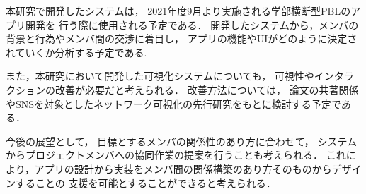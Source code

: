 
本研究で開発したシステムは，
2021年度9月より実施される学部横断型PBLのアプリ開発を
行う際に使用される予定である．
開発したシステムから，メンバの背景と行為やメンバ間の交渉に着目し，
アプリの機能やUIがどのように決定されていくか分析する予定である.

また，本研究において開発した可視化システムについても，
可視性やインタラクションの改善が必要だと考えられる．
改善方法については，
論文の共著関係やSNSを対象としたネットワーク可視化の先行研究をもとに検討する予定である．

今後の展望として，
目標とするメンバの関係性のあり方に合わせて，
システムからプロジェクトメンバへの協同作業の提案を行うことも考えられる．
これにより，アプリの設計から実装をメンバ間の関係構築のあり方そのものからデザインすることの
支援を可能とすることができると考えられる．
